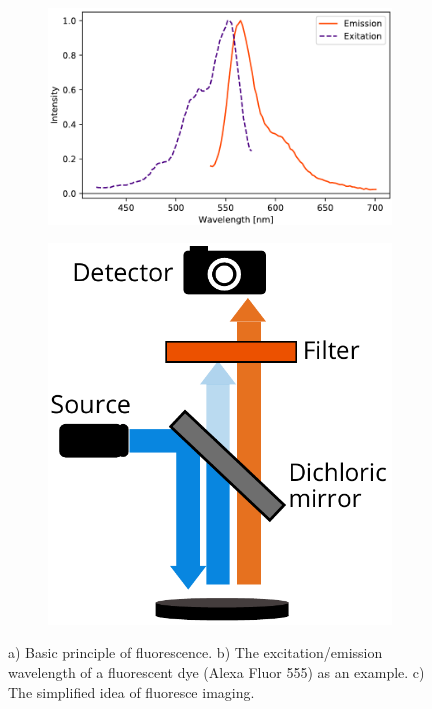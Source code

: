 \documentclass[final]{jyflluk}
\begin{document}
\begin{figure}[h]
    
    \vspace{1cm}
    \centering    
    \begin{subfigure}[t]{0.65\textwidth}
        \centering
        \includegraphics[width=\linewidth]{images/fluore.pdf} 
        \caption{} \label{fig:luo}
    \end{subfigure}
    \hfill
    \begin{subfigure}[t]{0.32\textwidth}
        \centering
        \includegraphics[width=\linewidth]{images/microsco.pdf} 
        \caption{} \label{fig:mic}
    \end{subfigure}
    \caption{a) Basic principle of fluorescence. b) The excitation/emission wavelength of a fluorescent dye (Alexa Fluor 555) as an example. c) The simplified idea of fluoresce imaging.} \label{fig:fluore}
\end{figure}
\end{document}
